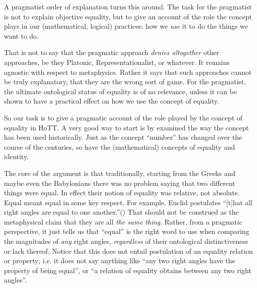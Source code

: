 \documentclass{article}
\begin{document}
A pragmatist order of explanation turns this around. The task for the
pragmatist is not to explain objective equality, but to give an
account of the role the concept plays in our (mathematical, logical)
practices: how we \textit{use} it to do the things we want to do.


That is not to say that the pragmatic approach \textit{denies
  altogether} other approaches, be they Platonic, Representationalist,
or whatever. It remains agnostic with respect to metaphysics. Rather
it says that such approaches cannot be truly explanatory, that they
are the wrong sort of game. For the pragmatist, the ultimate
ontological status of equality is of no relevance, unless it can be
shown to have a practical effect on how we use the concept of
equality.

So our task is to give a pragmatic account of the role played by the
concept of equality in HoTT. A very good way to start is by examined
the way the concept has been used historically. Just as the concept
``number'' has changed over the course of the centuries, so have the
(mathematical) concepts of equality and identity.

The core of the argument is that traditionally, starting from the
Greeks and maybe even the Babylonians there was no problem saying that
two different things were equal. In effect their notion of equality
was relative, not absolute. Equal meant equal in some key respect. For
example, Euclid postulates \enquote{[t]hat all right angles are equal
  to one another.}(\cite{euclid}) That should not be construed as the
metaphysical claim that they are all \textit{the same thing}. Rather,
from a pragmatic perspective, it just tells us that ``equal'' is the
right word to use when comparing the magnitudes of \textit{any} right
angles, \textit{regardless} of their ontological distinctiveness or
lack thereof. Notice that this does not entail postulation of an
equality relation or property; i.e. it does not say anything like
``any two right angles have the property of being equal'', or ``a
relation of equality obtains between any two right angles''.
\end{document}
